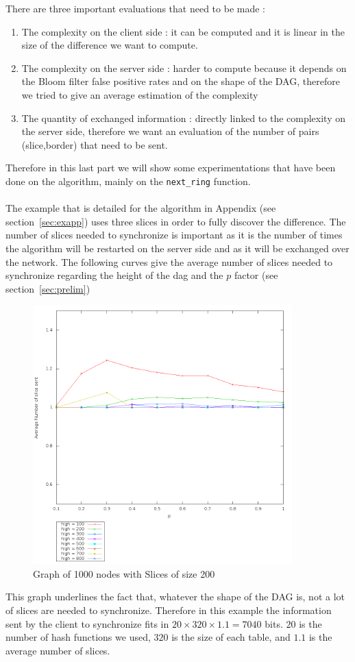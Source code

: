 There are three important evaluations that need to be made : 
\begin{enumerate}
 \item The complexity on the client side : it can be computed and it is linear in the size of the difference we want to compute.
 \item The complexity on the server side : harder to compute because it depends on the Bloom filter false positive rates and on the shape of the DAG, therefore we tried to give an average estimation of the complexity
 \item The quantity of exchanged information : directly linked to the complexity on the server side, therefore we want an evaluation of the number of pairs (slice,border) that need to be sent.
\end{enumerate}
Therefore in this last part we will show some experimentations that have been done on the algorithm, mainly on the \texttt{next\_ring} function.
\paragraph{} The example that is detailed for the algorithm in Appendix (see section~\ref{sec:exapp}) uses three slices in order to fully discover the difference. The number of slices needed to synchronize is important as it is the number of times the algorithm will be restarted on the server side and as it will be exchanged over the network. The following curves give the average number of slices needed to synchronize regarding the height of the dag and the $p$ factor (see section~\ref{sec:prelim})
 \begin{figure}[H]
 \centering
  \includegraphics[height=10cm]{./image/slicesent/Nb_sent_slice.png}
  \caption{Graph of 1000 nodes with Slices of size 200}
 \end{figure}
 This graph underlines the fact that, whatever the shape of the DAG is, not a lot of slices are needed to synchronize. Therefore in this example the information sent by the client to synchronize fits in $20\times 320 \times 1.1 = 7040$ bits. $20$ is the number of hash functions we used, $320$ is the size of each table, and $1.1$ is the average number of slices.
 
